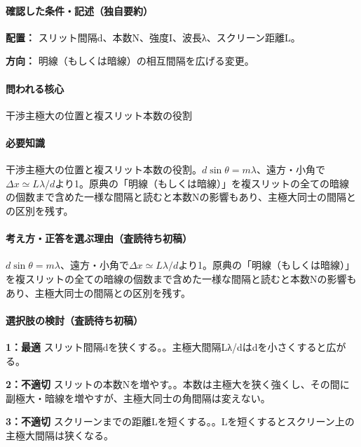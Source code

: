\paragraph{確認した条件・記述（独自要約）}\mbox{}\par

\noindent\textbf{配置：} スリット間隔d、本数N、強度I、波長λ、スクリーン距離L。\par

\noindent\textbf{方向：} 明線（もしくは暗線）の相互間隔を広げる変更。\par

\paragraph{問われる核心} 干渉主極大の位置と複スリット本数の役割

\paragraph{必要知識} 干渉主極大の位置と複スリット本数の役割。\(d\sin\theta=m\lambda\)、遠方・小角で\(\Delta x\simeq L\lambda/d\)より1。原典の「明線（もしくは暗線）」を複スリットの全ての暗線の個数まで含めた一様な間隔と読むと本数Nの影響もあり、主極大同士の間隔との区別を残す。

\paragraph{考え方・正答を選ぶ理由（査読待ち初稿）} \(d\sin\theta=m\lambda\)、遠方・小角で\(\Delta x\simeq L\lambda/d\)より1。原典の「明線（もしくは暗線）」を複スリットの全ての暗線の個数まで含めた一様な間隔と読むと本数Nの影響もあり、主極大同士の間隔との区別を残す。

\paragraph{選択肢の検討（査読待ち初稿）}\mbox{}\par

\noindent\textbf{1：最適} スリット間隔dを狭くする。。主極大間隔Lλ/dはdを小さくすると広がる。\par

\noindent\textbf{2：不適切} スリットの本数Nを増やす。。本数は主極大を狭く強くし、その間に副極大・暗線を増やすが、主極大同士の角間隔は変えない。\par

\noindent\textbf{3：不適切} スクリーンまでの距離Lを短くする。。Lを短くするとスクリーン上の主極大間隔は狭くなる。\par

